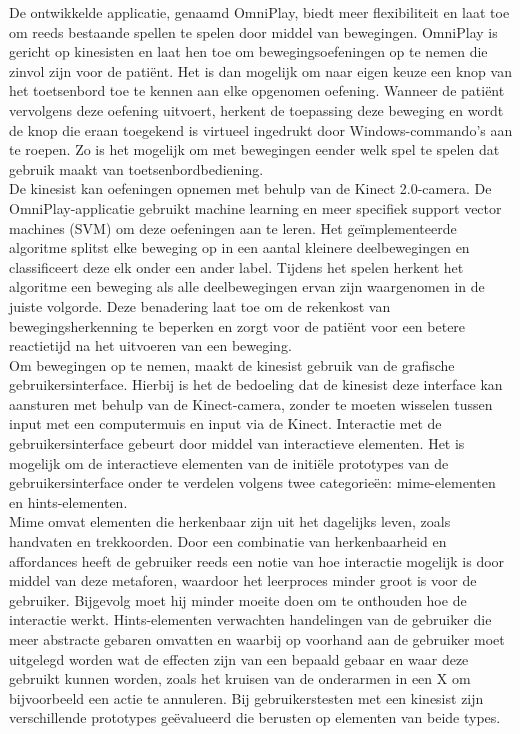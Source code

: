 De ontwikkelde applicatie, genaamd OmniPlay, biedt meer flexibiliteit en laat toe om reeds bestaande spellen te spelen door middel van bewegingen. OmniPlay is gericht op kinesisten en laat hen toe om bewegingsoefeningen op te nemen die zinvol zijn voor de pati\"ent. Het is dan mogelijk om naar eigen keuze een knop van het toetsenbord toe te kennen aan elke opgenomen oefening. Wanneer de pati\"ent vervolgens deze oefening uitvoert, herkent de toepassing deze beweging en wordt de knop die eraan toegekend is virtueel ingedrukt door Windows-commando's aan te roepen. Zo is het mogelijk om met bewegingen eender welk spel te spelen dat gebruik maakt van toetsenbordbediening.\\

De kinesist kan oefeningen opnemen met behulp van de Kinect 2.0-camera. De OmniPlay-applicatie gebruikt machine learning en meer specifiek support vector machines (SVM) om deze oefeningen aan te leren. Het ge\"implementeerde algoritme splitst elke beweging op in een aantal kleinere deelbewegingen en classificeert deze elk onder een ander label. Tijdens het spelen herkent het algoritme een beweging als alle deelbewegingen ervan zijn waargenomen in de juiste volgorde. Deze benadering laat toe om de rekenkost van bewegingsherkenning te beperken en zorgt voor de pati\"ent voor een betere reactietijd na het uitvoeren van een beweging.\\

Om bewegingen op te nemen, maakt de kinesist gebruik van de grafische gebruikersinterface. Hierbij is het de bedoeling dat de kinesist deze interface kan aansturen met behulp van de Kinect-camera, zonder te moeten wisselen tussen input met een computermuis en input via de Kinect. Interactie met de gebruikersinterface gebeurt door middel van interactieve elementen. Het is mogelijk om de interactieve elementen van de initi\"ele prototypes van de gebruikersinterface onder te verdelen volgens twee categorie\"en: mime-elementen en hints-elementen.\\

Mime omvat elementen die herkenbaar zijn uit het dagelijks leven, zoals handvaten en trekkoorden. Door een combinatie van herkenbaarheid en affordances heeft de gebruiker reeds een notie van hoe interactie mogelijk is door middel van deze metaforen, waardoor het leerproces minder groot is voor de gebruiker. Bijgevolg moet hij minder moeite doen om te onthouden hoe de interactie werkt. Hints-elementen verwachten handelingen van de gebruiker die meer abstracte gebaren omvatten en waarbij op voorhand aan de gebruiker moet uitgelegd worden wat de effecten zijn van een bepaald gebaar en waar deze gebruikt kunnen worden, zoals het kruisen van de onderarmen in een X om bijvoorbeeld een actie te annuleren. Bij gebruikerstesten met een kinesist zijn verschillende prototypes ge\"evalueerd die berusten op elementen van beide types.\\

